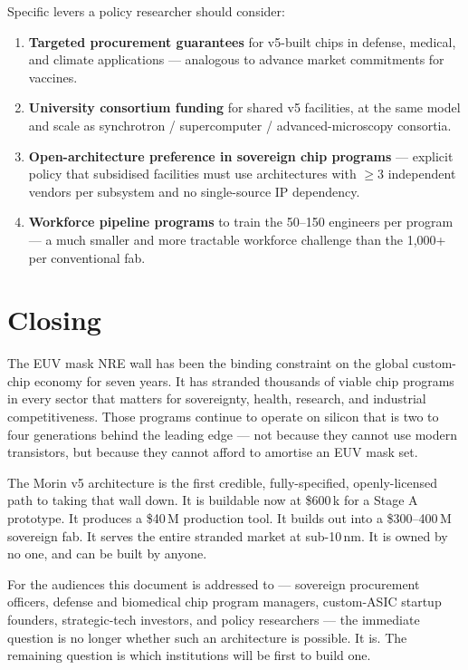 \documentclass[11pt,letterpaper]{article}
\begin{document}
Specific levers a policy researcher should consider:

\begin{enumerate}[leftmargin=1.6em]
  \item \textbf{Targeted procurement guarantees} for v5-built chips in defense, medical, and climate applications --- analogous to advance market commitments for vaccines.
  \item \textbf{University consortium funding} for shared v5 facilities, at the same model and scale as synchrotron / supercomputer / advanced-microscopy consortia.
  \item \textbf{Open-architecture preference in sovereign chip programs} --- explicit policy that subsidised facilities must use architectures with $\geq 3$ independent vendors per subsystem and no single-source IP dependency.
  \item \textbf{Workforce pipeline programs} to train the 50--150 engineers per program --- a much smaller and more tractable workforce challenge than the 1{,}000+ per conventional fab.
\end{enumerate}

\section{Closing}

The EUV mask NRE wall has been the binding constraint on the global custom-chip economy for seven years. It has stranded thousands of viable chip programs in every sector that matters for sovereignty, health, research, and industrial competitiveness. Those programs continue to operate on silicon that is two to four generations behind the leading edge --- not because they cannot use modern transistors, but because they cannot afford to amortise an EUV mask set.

The Morin v5 architecture is the first credible, fully-specified, openly-licensed path to taking that wall down. It is buildable now at \$600\,k for a Stage A prototype. It produces a \$40\,M production tool. It builds out into a \$300--400\,M sovereign fab. It serves the entire stranded market at sub-10\,nm. It is owned by no one, and can be built by anyone.

For the audiences this document is addressed to --- sovereign procurement officers, defense and biomedical chip program managers, custom-ASIC startup founders, strategic-tech investors, and policy researchers --- the immediate question is no longer whether such an architecture is possible. It is. The remaining question is which institutions will be first to build one.
\end{document}
